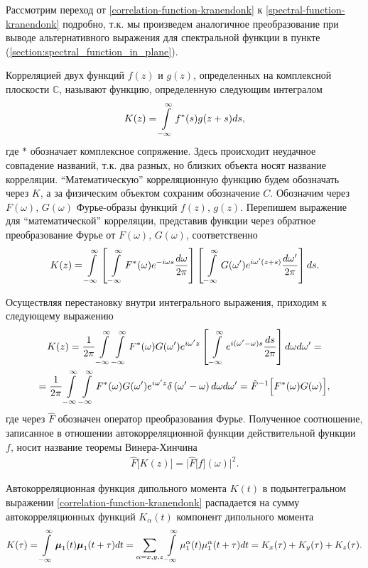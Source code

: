 Рассмотрим переход от \eqref{correlation-function-kranendonk} к \eqref{spectral-function-kranendonk} подробно, т.к. мы произведем аналогичное преобразование при выводе альтернативного выражения для спектральной функции в пункте (\ref{section:spectral_function_in_plane}). \par
Корреляцией двух функций $f(z)$ и $g(z)$, определенных на комплексной плоскости $\mathbb{C}$, называют функцию, определенную следующим интегралом
\begin{gather}
    K(z) = \int\limits_{-\infty}^\infty f^*(s) g(z + s) ds,
\end{gather}
% 
где $*$ обозначает комплексное сопряжение. Здесь происходит неудачное совпадение названий, т.к. два разных, но близких объекта носят название корреляции. \enquote{Математическую} корреляционную функцию будем обозначать через $K$, а за физическим объектом сохраним обозначение $C$. Обозначим через $F(\omega)$, $G(\omega)$ Фурье-образы функций $f(z)$, $g(z)$. Перепишем выражение для \enquote{математической} корреляции, представив функции через обратное преобразование Фурье от $F(\omega)$, $G(\omega)$, соответственно
\begin{gather}
    K(z) = \int\limits_{-\infty}^\infty \left[ \, \int\limits_{-\infty}^\infty F^*(\omega) e^{-i \omega s} \frac{d \omega}{2 \pi} \right] \left[ \, \int\limits_{-\infty}^\infty G(\omega^\prime) e^{i \omega^\prime (z + s)} \frac{d\omega^\prime}{2 \pi} \right] ds.
\end{gather}

Осуществляя перестановку внутри интегрального выражения, приходим к следующему выражению 
\begin{gather}
    K(z) = \frac{1}{2\pi} \int\limits_{-\infty}^\infty \int\limits_{-\infty}^\infty F^*(\omega) G(\omega^\prime) e^{i \omega^\prime z} \left[ \, \int\limits_{-\infty}^\infty e^{i (\omega^\prime - \omega) s} \frac{ds}{2 \pi} \right] d\omega d\omega^\prime = \notag \\
    = \frac{1}{2\pi} \int\limits_{-\infty}^\infty \int\limits_{-\infty}^\infty F^*(\omega) G(\omega^\prime) e^{i \omega^\prime z} \delta \left( \omega^\prime - \omega \right) d\omega d\omega^\prime = \hat{F}^{-1} \Big[ F^*(\omega) G(\omega) \Big],
\end{gather}
%
где через $\hat{F}$ обозначен оператор преобразования Фурье. Полученное соотношение, записанное в отношении автокорреляционной функции действительной функции $f$, носит название теоремы Винера-Хинчина \cite{frommhold}
\begin{gather}
    \hat{F} \Big[ K(z) \Big] = \Bigg\vert \hat{F}\Big[ f \Big](\omega) \Bigg\vert^2. 
\end{gather}

Автокорреляционная функция дипольного момента $K(t)$ в подынтегральном выражении \eqref{correlation-function-kranendonk} распадается на сумму автокорреляционных функций $K_\alpha(t)$ компонент дипольного момента 
\begin{gather}
    K(\tau) = \int\limits_{-\infty}^\infty \boldsymbol{\mu}_1(t) \boldsymbol{\mu}_1(t + \tau) dt = \sum_{\alpha = x, y, z} \int\limits_{-\infty}^\infty \mu_1^\alpha(t) \mu_1^\alpha(t + \tau) dt = K_x(\tau) + K_y(\tau) + K_z(\tau).
\end{gather}

